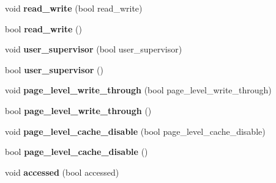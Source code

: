 \begin{DoxyCompactItemize}
\item 
\hypertarget{classintel64__page__entry__base_a8828b905bf1dbc704b8786b31a90fad0}{}void {\bfseries read\+\_\+write} (bool read\+\_\+write)\label{classintel64__page__entry__base_a8828b905bf1dbc704b8786b31a90fad0}

\item 
\hypertarget{classintel64__page__entry__base_a94f2ccab5f9071c6c74ddfa7fc007452}{}bool {\bfseries read\+\_\+write} ()\label{classintel64__page__entry__base_a94f2ccab5f9071c6c74ddfa7fc007452}

\item 
\hypertarget{classintel64__page__entry__base_a9cc519025452738d236cae4d96ccb541}{}void {\bfseries user\+\_\+supervisor} (bool user\+\_\+supervisor)\label{classintel64__page__entry__base_a9cc519025452738d236cae4d96ccb541}

\item 
\hypertarget{classintel64__page__entry__base_ab854b032b6e9617b009c924411e15b48}{}bool {\bfseries user\+\_\+supervisor} ()\label{classintel64__page__entry__base_ab854b032b6e9617b009c924411e15b48}

\item 
\hypertarget{classintel64__page__entry__base_a5871c3a2bef99de0e2d8c351bc5709e1}{}void {\bfseries page\+\_\+level\+\_\+write\+\_\+through} (bool page\+\_\+level\+\_\+write\+\_\+through)\label{classintel64__page__entry__base_a5871c3a2bef99de0e2d8c351bc5709e1}

\item 
\hypertarget{classintel64__page__entry__base_a949e0e8fec5de738ae9bf6c27b7a7ff3}{}bool {\bfseries page\+\_\+level\+\_\+write\+\_\+through} ()\label{classintel64__page__entry__base_a949e0e8fec5de738ae9bf6c27b7a7ff3}

\item 
\hypertarget{classintel64__page__entry__base_a7d3cd7dbf83dd8eaa46d398b3aa3a2f8}{}void {\bfseries page\+\_\+level\+\_\+cache\+\_\+disable} (bool page\+\_\+level\+\_\+cache\+\_\+disable)\label{classintel64__page__entry__base_a7d3cd7dbf83dd8eaa46d398b3aa3a2f8}

\item 
\hypertarget{classintel64__page__entry__base_aa97e30b93572177a13606507b5c3eea1}{}bool {\bfseries page\+\_\+level\+\_\+cache\+\_\+disable} ()\label{classintel64__page__entry__base_aa97e30b93572177a13606507b5c3eea1}

\item 
\hypertarget{classintel64__page__entry__base_a7af8cc00e2a9d8988f8cb251ce572274}{}void {\bfseries accessed} (bool accessed)\label{classintel64__page__entry__base_a7af8cc00e2a9d8988f8cb251ce572274}


\end{DoxyCompactItemize}
